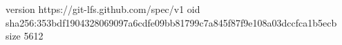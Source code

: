 version https://git-lfs.github.com/spec/v1
oid sha256:353bdf1904328069097a6cdfe09bb81799c7a845f87f9e108a03dccfca1b5ecb
size 5612
